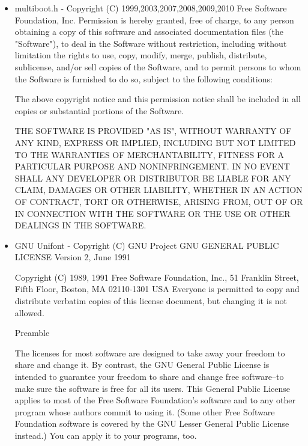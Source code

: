 \documentclass[11pt,a4paper]{article}
\begin{document}
	\begin{itemize}
		\item multiboot.h - Copyright (C) 1999,2003,2007,2008,2009,2010  Free Software Foundation, Inc.
		\newline
		Permission is hereby granted, free of charge, to any person obtaining a copy
		of this software and associated documentation files (the "Software"), to
		deal in the Software without restriction, including without limitation the
		rights to use, copy, modify, merge, publish, distribute, sublicense, and/or
		sell copies of the Software, and to permit persons to whom the Software is
		furnished to do so, subject to the following conditions:

		The above copyright notice and this permission notice shall be included in
		all copies or substantial portions of the Software.

		THE SOFTWARE IS PROVIDED "AS IS", WITHOUT WARRANTY OF ANY KIND, EXPRESS OR
		IMPLIED, INCLUDING BUT NOT LIMITED TO THE WARRANTIES OF MERCHANTABILITY,
		FITNESS FOR A PARTICULAR PURPOSE AND NONINFRINGEMENT.  IN NO EVENT SHALL ANY
		DEVELOPER OR DISTRIBUTOR BE LIABLE FOR ANY CLAIM, DAMAGES OR OTHER LIABILITY,
		WHETHER IN AN ACTION OF CONTRACT, TORT OR OTHERWISE, ARISING FROM, OUT OF OR
		IN CONNECTION WITH THE SOFTWARE OR THE USE OR OTHER DEALINGS IN THE SOFTWARE.

		\item GNU Unifont - Copyright (C) GNU Project
		\newline
		GNU GENERAL PUBLIC LICENSE
		Version 2, June 1991

		Copyright (C) 1989, 1991 Free Software Foundation, Inc.,
		51 Franklin Street, Fifth Floor, Boston, MA 02110-1301 USA
		Everyone is permitted to copy and distribute verbatim copies
		of this license document, but changing it is not allowed.

		Preamble

		The licenses for most software are designed to take away your
		freedom to share and change it.  By contrast, the GNU General Public
		License is intended to guarantee your freedom to share and change free
		software--to make sure the software is free for all its users.  This
		General Public License applies to most of the Free Software
		Foundation's software and to any other program whose authors commit to
		using it.  (Some other Free Software Foundation software is covered by
		the GNU Lesser General Public License instead.)  You can apply it to
		your programs, too.


\end{itemize}
\end{document}
